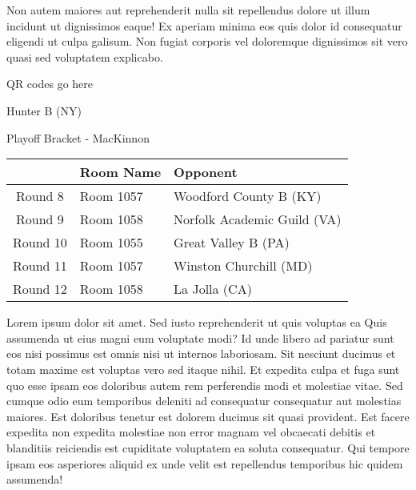 \documentclass{article}%
\begin{document}
\newline%
Non autem maiores aut reprehenderit nulla sit repellendus dolore ut illum incidunt ut dignissimos eaque! Ex aperiam minima eos quis dolor id consequatur eligendi ut culpa galisum. Non fugiat corporis vel doloremque dignissimos sit vero quasi sed voluptatem explicabo.\newline%
\newline%
%
\vspace*{30pt}%
\begin{center}%
\begin{Huge}%
QR codes go here%
\end{Huge}%
\end{center}%
\newpage%
\begin{center}%
\begin{Huge}%
Hunter B (NY)%
\end{Huge}%
\vspace*{8pt}%
\linebreak%
\begin{Large}%
Playoff Bracket {-} MacKinnon%
\end{Large}%
\end{center}%
\begin{tabularx}{\textwidth}{|c|Y|Y|}%
\hline%
&Room Name&Opponent\\%
\hline%
Round 8&Room 1057&Woodford County B (KY)\\%
Round 9&Room 1058&Norfolk Academic Guild (VA)\\%
Round 10&Room 1055&Great Valley B (PA)\\%
Round 11&Room 1057&Winston Churchill (MD)\\%
Round 12&Room 1058&La Jolla (CA)\\%
\hline%
\end{tabularx}%
\vspace*{8pt}%
\linebreak%
\newline%
\newline%
Lorem ipsum dolor sit amet. Sed iusto reprehenderit ut quis voluptas ea Quis assumenda ut eius magni eum voluptate modi? Id unde libero ad pariatur sunt eos nisi possimus est omnis nisi ut internos laboriosam. Sit nesciunt ducimus et totam maxime est voluptas vero sed itaque nihil. Et expedita culpa et fuga sunt quo esse ipsam eos doloribus autem rem perferendis modi et molestiae vitae.\newline%
\newline%
Sed cumque odio eum temporibus deleniti ad consequatur consequatur aut molestias maiores. Est doloribus tenetur est dolorem ducimus sit quasi provident. Est facere expedita non expedita molestiae non error magnam vel obcaecati debitis et blanditiis reiciendis est cupiditate voluptatem ea soluta consequatur. Qui tempore ipsam eos asperiores aliquid ex unde velit est repellendus temporibus hic quidem assumenda!\newline%
\end{document}
